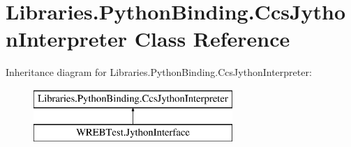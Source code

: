 \hypertarget{class_libraries_1_1_python_binding_1_1_ccs_jython_interpreter}{}\section{Libraries.\+Python\+Binding.\+Ccs\+Jython\+Interpreter Class Reference}
\label{class_libraries_1_1_python_binding_1_1_ccs_jython_interpreter}
Inheritance diagram for Libraries.\+Python\+Binding.\+Ccs\+Jython\+Interpreter\+:\begin{figure}[H]
\begin{center}
\leavevmode
\includegraphics[height=2.000000cm]{class_libraries_1_1_python_binding_1_1_ccs_jython_interpreter}
\end{center}
\end{figure}
